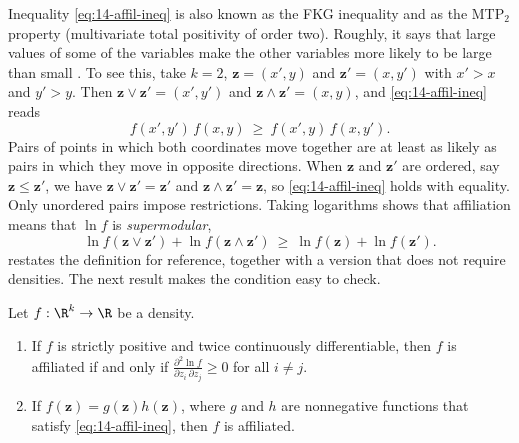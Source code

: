 Inequality \eqref{eq:14-affil-ineq} is also known as the FKG inequality and as the MTP$_2$ property
(multivariate total positivity of order two). Roughly, it says that large values of some of the variables
make the other variables more likely to be large than small \citep[p.~1098]{MilgromWeber1982}. To see
this, take $k=2$, $\bm z=(x',y)$ and $\bm z'=(x,y')$ with $x'>x$ and $y'>y$. Then $\bm z\vee\bm z'=(x',y')$
and $\bm z\wedge\bm z'=(x,y)$, and \eqref{eq:14-affil-ineq} reads
\begin{equation}\label{eq:14-affil-2d}
f(x',y')\,f(x,y)\ \ge\ f(x',y)\,f(x,y').
\end{equation}
Pairs of points in which both coordinates move together are at least as likely as pairs in which they move
in opposite directions. When $\bm z$ and $\bm z'$ are ordered, say $\bm z\le\bm z'$, we have
$\bm z\vee\bm z'=\bm z'$ and $\bm z\wedge\bm z'=\bm z$, so \eqref{eq:14-affil-ineq} holds with equality.
Only unordered pairs impose restrictions. Taking logarithms shows that affiliation means that $\ln f$ is
\emph{supermodular},
\[
\ln f(\bm z\vee\bm z')+\ln f(\bm z\wedge\bm z')\ \ge\ \ln f(\bm z)+\ln f(\bm z').
\]
 restates the definition for reference, together with a version that does not
require densities. The next result makes the condition easy to check.

\begin{proposition}\label{prop:14-affil-char}
Let $f:\R^k\to\R$ be a density.
\begin{enumerate}[label=(\roman*)]
  \item If $f$ is strictly positive and twice continuously differentiable, then $f$ is affiliated if and only
  if $\frac{\partial^2\ln f}{\partial z_i\,\partial z_j}\ge 0$ for all $i\neq j$.
  \item If $f(\bm z)=g(\bm z)h(\bm z)$, where $g$ and $h$ are nonnegative functions that satisfy
  \eqref{eq:14-affil-ineq}, then $f$ is affiliated.
\end{enumerate}
\end{proposition}

